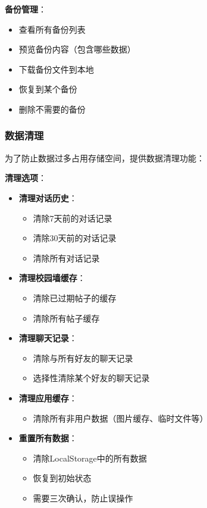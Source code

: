 \documentclass[12pt,a4paper]{article}
\begin{document}
\textbf{备份管理}：
\begin{itemize}
    \item 查看所有备份列表
    \item 预览备份内容（包含哪些数据）
    \item 下载备份文件到本地
    \item 恢复到某个备份
    \item 删除不需要的备份
\end{itemize}

\subsubsection{数据清理}

为了防止数据过多占用存储空间，提供数据清理功能：

\textbf{清理选项}：
\begin{itemize}
    \item \textbf{清理对话历史}：
        \begin{itemize}
            \item 清除7天前的对话记录
            \item 清除30天前的对话记录
            \item 清除所有对话记录
        \end{itemize}
    \item \textbf{清理校园墙缓存}：
        \begin{itemize}
            \item 清除已过期帖子的缓存
            \item 清除所有帖子缓存
        \end{itemize}
    \item \textbf{清理聊天记录}：
        \begin{itemize}
            \item 清除与所有好友的聊天记录
            \item 选择性清除某个好友的聊天记录
        \end{itemize}
    \item \textbf{清理应用缓存}：
        \begin{itemize}
            \item 清除所有非用户数据（图片缓存、临时文件等）
        \end{itemize}
    \item \textbf{重置所有数据}：
        \begin{itemize}
            \item 清除LocalStorage中的所有数据
            \item 恢复到初始状态
            \item 需要三次确认，防止误操作
        \end{itemize}
\end{itemize}
\end{document}
